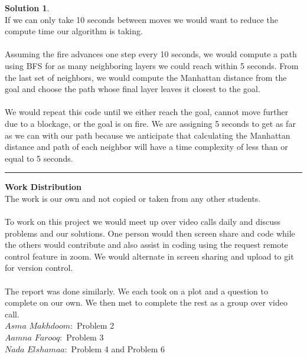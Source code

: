 \documentclass{article}
\theoremstyle{definition}
\def\fline{\rule{0.75\linewidth}{0.5pt}}
\newcommand{\finishline}{\vspace{-15pt}\begin{center}\fline\end{center}}
\newtheorem*{solution*}{Solution}
\newenvironment{solution}{\begin{solution*}}{{\finishline} \end{solution*}}
\begin{document}
\begin{solution} \hfill \\
     If we can only take 10 seconds between moves we would want to reduce the compute time our algorithm is taking. 
     \\\\
     Assuming the fire advances one step every 10 seconds, we would compute a path using BFS for as many neighboring layers we could reach within 5 seconds. From the last set of neighbors, we would compute the Manhattan distance from the goal and choose the path whose final layer leaves it closest to the goal. 
     \\\\
	 We would repeat this code until we either reach the goal, cannot move further due to a blockage, or the goal is on fire. 
	 We are assigning 5 seconds to get as far as we can with our path because we anticipate that calculating the Manhattan distance and path of each neighbor will have a time complexity of less than or equal to 5 seconds. 
	 
	 
\end{solution}

\textbf{Work Distribution}
\\
The work is our own and not copied or taken from any other students. 
\\\\
To work on this project we would meet up over video calls daily and discuss problems and our solutions. One person would then screen share and code while the others would contribute and also assist in coding using the request remote control feature in zoom. We would alternate in screen sharing and upload to git for version control. 
\\\\
The report was done similarly. We each took on a plot and a question to complete on our own. We then met to complete the rest as a group over video call. 
\\
$Asma$ $Makhdoom:$ Problem 2
\\
$Aamna$ $Farooq:$ Problem 3
\\
$Nada$ $Elshamaa:$ Problem 4 and Problem 6
\\
\smallskip
\end{document}
